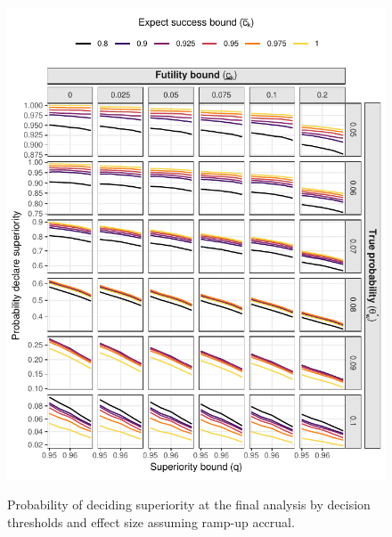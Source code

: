 \documentclass{article}
\begin{document}
\begin{figure}[!ht]
	\caption{Probability of deciding superiority at the final analysis by decision thresholds and effect size assuming ramp-up accrual.}
	\includegraphics{figures/superiority_5.pdf}
	\label{fig:superiority_rampup}
\end{figure}
\end{document}
